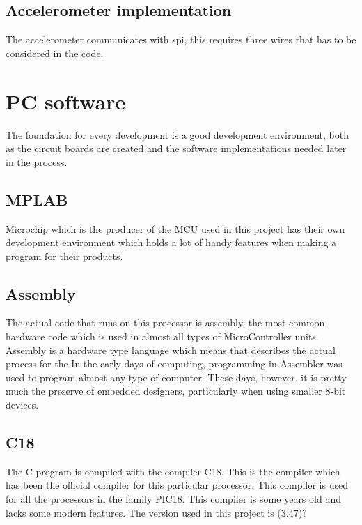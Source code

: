 \subsection{Accelerometer implementation}
The accelerometer communicates with \gls{spi}, this requires three wires that has to be considered in the code.


\section{PC software}
The foundation for every development is a good development environment, both as the circuit boards are created and the software implementations needed later in the process.


\subsection{MPLAB}
Microchip which is the producer of the MCU used in this project has their own development environment which holds a lot of handy features when making a program for their products. 



\subsection{Assembly}
The actual code that runs on this processor is assembly, the most common hardware code which is used in almost all types of MicroController units. Assembly is a hardware type language which means that describes the actual process for the 
In the early days of computing, programming in Assembler was used to program almost any type of
computer. These days, however, it is pretty much the preserve of embedded designers, particularly when
using smaller 8-bit devices. \cite{designing_with_pic}

\subsection{C18}
The C program is compiled with the compiler C18. This is the compiler which has been the official compiler for this particular processor. This compiler is used for all the processors in the family PIC18. This compiler is some years old and lacks some modern features. The version used in this project is (3.47)?